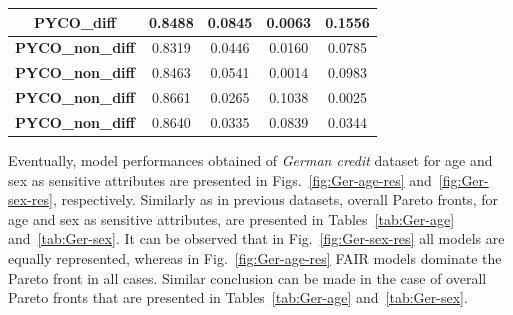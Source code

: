 \documentclass[preprint,12pt]{elsarticle}
\begin{document}
\begin{table}
\begin{tabular}{|c|c|c|c|c|}
		\textbf{PYCO\_diff}      & 0.8488       & 0.0845       & 0.0063       & 0.1556        \\ \hline
		\textbf{PYCO\_non\_diff} & 0.8319       & 0.0446       & 0.0160       & 0.0785        \\ \hline
		\textbf{PYCO\_non\_diff} & 0.8463       & 0.0541       & 0.0014       & 0.0983        \\ \hline
		\textbf{PYCO\_non\_diff} & 0.8661       & 0.0265       & 0.1038       & 0.0025        \\ \hline
		\textbf{PYCO\_non\_diff} & 0.8640       & 0.0335       & 0.0839       & 0.0344        \\ \hline
	\end{tabular}
	\label{tab:MEPS-19}%
\end{table}

Eventually, model performances obtained of \textit{German credit} dataset for age and sex as sensitive attributes are presented in Figs.~\ref{fig:Ger-age-res} and~\ref{fig:Ger-sex-res}, respectively. Similarly as in previous datasets, overall Pareto fronts, for age and sex as sensitive attributes, are presented in Tables~\ref{tab:Ger-age} and~\ref{tab:Ger-sex}. It can be observed that in  Fig.~\ref{fig:Ger-sex-res} all models are equally represented, whereas in  Fig.~\ref{fig:Ger-age-res} FAIR models dominate the Pareto front in all cases. Similar conclusion can be made in the case of overall Pareto fronts that are presented in Tables~\ref{tab:Ger-age} and~\ref{tab:Ger-sex}. 
\end{document}
